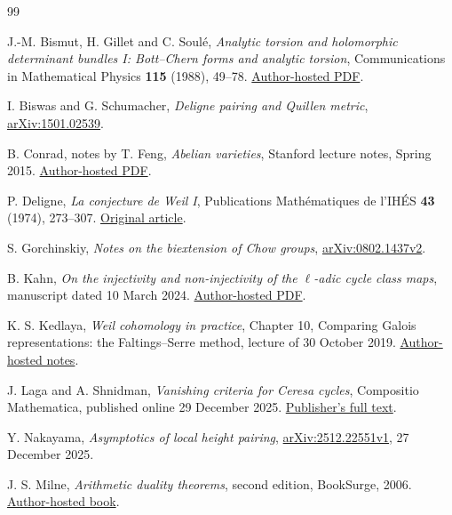 \begin{thebibliography}{99}

J.-M. Bismut, H. Gillet and C. Soulé,
\emph{Analytic torsion and holomorphic determinant bundles I:
Bott--Chern forms and analytic torsion},
Communications in Mathematical Physics \textbf{115} (1988), 49--78.
\href{https://www.imo.universite-paris-saclay.fr/~jean-michel.bismut/Bismut/1988.pdf}
{Author-hosted PDF}.

I. Biswas and G. Schumacher,
\emph{Deligne pairing and Quillen metric},
\href{https://arxiv.org/abs/1501.02539}{arXiv:1501.02539}.

B. Conrad, notes by T. Feng,
\emph{Abelian varieties}, Stanford lecture notes, Spring 2015.
\href{https://math.stanford.edu/~conrad/249CS15Page/handouts/abvarnotes.pdf}
{Author-hosted PDF}.

P. Deligne, \emph{La conjecture de Weil I},
Publications Mathématiques de l'IHÉS \textbf{43} (1974), 273--307.
\href{https://www.numdam.org/article/PMIHES_1974__43__273_0.pdf}
{Original article}.

S. Gorchinskiy, \emph{Notes on the biextension of Chow groups},
\href{https://arxiv.org/abs/0802.1437v2}{arXiv:0802.1437v2}.

B. Kahn, \emph{On the injectivity and non-injectivity of the
\(\ell\)-adic cycle class maps}, manuscript dated 10 March 2024.
\href{https://webusers.imj-prg.fr/~bruno.kahn/preprints/ladic-cycle-class-rev3.pdf}
{Author-hosted PDF}.

K. S. Kedlaya, \emph{Weil cohomology in practice},
Chapter 10, Comparing Galois representations: the Faltings--Serre
method, lecture of 30 October 2019.
\href{https://kskedlaya.org/weil-cohom/chapter-10.html}
{Author-hosted notes}.

J. Laga and A. Shnidman, \emph{Vanishing criteria for Ceresa cycles},
Compositio Mathematica, published online 29 December 2025.
\href{https://www.cambridge.org/core/journals/compositio-mathematica/article/vanishing-criteria-for-ceresa-cycles/051A1B2257FB703EA13086A238A279B8}
{Publisher's full text}.

Y. Nakayama, \emph{Asymptotics of local height pairing},
\href{https://arxiv.org/abs/2512.22551v1}{arXiv:2512.22551v1},
27 December 2025.

J. S. Milne, \emph{Arithmetic duality theorems}, second edition,
BookSurge, 2006.
\href{https://jmilne.org/math/Books/ADTnot.pdf}{Author-hosted book}.


\end{thebibliography}
